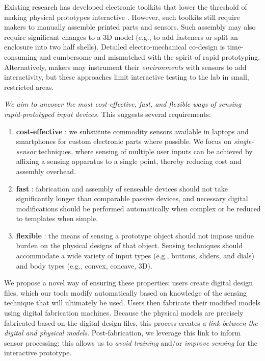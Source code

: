 Existing research has developed electronic toolkits that lower the threshold of making physical prototypes interactive \cite{arduino,greenberg-phidgets}. However, such toolkits still require makers to manually assemble printed parts and sensors. Such assembly may also require significant changes to a 3D model (e.g., to add fasteners or split an enclosure into two half shells). Detailed electro-mechanical co-design is time-consuming and cumbersome and mismatched with the spirit of rapid prototyping. Alternatively, makers may instrument their  \emph{environments} with sensors \cite{akaoka-displayobjects,wilson-depthtouch} to add interactivity, but these approaches limit interactive testing to the lab in small, restricted areas.

\emph{We aim to uncover the most cost-effective, fast, and flexible ways of sensing rapid-prototyped input devices.} This suggests several requirements:
\begin{enumerate}
\item \textbf{cost-effective} : we substitute commodity sensors available in laptops and smartphones for custom electronic parts where possible. We focus on \emph{single-sensor} techniques, where sensing of multiple user inputs can be achieved by affixing a sensing apparatus to a single point, thereby reducing cost and assembly overhead.
\item \textbf{fast} : fabrication and assembly of senseable devices should not take significantly longer than comparable passive devices, and necessary digital modifications should be performed automatically when complex or be reduced to templates when simple.
\item \textbf{flexible} : the means of sensing a prototype object should not impose undue burden on the physical designs of that object. Sensing techniques should accommodate a wide variety of input types (e.g., buttons, sliders, and dials) and body types (e.g., convex, concave, 3D).
\end{enumerate}
We propose a novel way of ensuring these properties: users create digital design files, which our tools modify automatically based on knowledge of the sensing technique that will ultimately be used. Users then fabricate their modified models using digital fabrication machines. Because the physical models are precisely fabricated based on the digital design files, this process creates a \emph{link between the digital and physical models}. Post-fabrication, we leverage this link to inform sensor processing: this allows us to \emph{avoid training} and/or \emph{improve sensing} for the interactive prototype.

